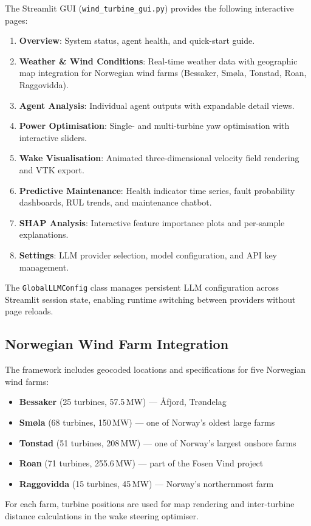 \documentclass[12pt]{article}
\begin{document}
The Streamlit GUI (\texttt{wind\_turbine\_gui.py}) provides the following interactive pages:
\begin{enumerate}[leftmargin=*]
    \item \textbf{Overview}: System status, agent health, and quick-start guide.
    \item \textbf{Weather \& Wind Conditions}: Real-time weather data with geographic map integration for Norwegian wind farms (Bessaker, Sm{\o}la, Tonstad, Roan, Raggovidda).
    \item \textbf{Agent Analysis}: Individual agent outputs with expandable detail views.
    \item \textbf{Power Optimisation}: Single- and multi-turbine yaw optimisation with interactive sliders.
    \item \textbf{Wake Visualisation}: Animated three-dimensional velocity field rendering and VTK export.
    \item \textbf{Predictive Maintenance}: Health indicator time series, fault probability dashboards, RUL trends, and maintenance chatbot.
    \item \textbf{SHAP Analysis}: Interactive feature importance plots and per-sample explanations.
    \item \textbf{Settings}: LLM provider selection, model configuration, and API key management.
\end{enumerate}

The \texttt{GlobalLLMConfig} class manages persistent LLM configuration across Streamlit session state, enabling runtime switching between providers without page reloads.

\subsection{Norwegian Wind Farm Integration}

The framework includes geocoded locations and specifications for five Norwegian wind farms:
\begin{itemize}[leftmargin=*]
    \item \textbf{Bessaker} (25 turbines, 57.5\,MW) --- {\AA}fjord, Tr{\o}ndelag
    \item \textbf{Sm{\o}la} (68 turbines, 150\,MW) --- one of Norway's oldest large farms
    \item \textbf{Tonstad} (51 turbines, 208\,MW) --- one of Norway's largest onshore farms
    \item \textbf{Roan} (71 turbines, 255.6\,MW) --- part of the Fosen Vind project
    \item \textbf{Raggovidda} (15 turbines, 45\,MW) --- Norway's northernmost farm
\end{itemize}
For each farm, turbine positions are used for map rendering and inter-turbine distance calculations in the wake steering optimiser.
\end{document}
